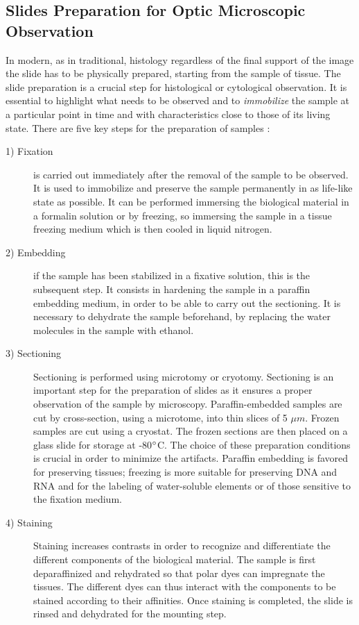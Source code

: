 \subsection{Slides Preparation for Optic Microscopic Observation} \label{ssec:samp_prep}
    In modern, as in traditional, histology regardless of the final support of the image the slide has to be physically prepared, starting from the sample of tissue. The slide preparation is a crucial step for histological or cytological observation. It is essential to highlight what needs to be observed and to \textit{immobilize} the sample at a particular point in time and with characteristics close to those of its living state. There are five key steps for the preparation of samples \cite{Alturkistani2015}:
    \begin{description}
        \item [1) Fixation] is carried out immediately after the removal of the sample to be observed. It is used to immobilize and preserve the sample permanently in as life-like state as possible. It can be performed immersing the biological material in a formalin solution or by freezing, so immersing the sample in a tissue freezing medium which is then cooled in liquid nitrogen.

        \item [2) Embedding] if the sample has been stabilized in a fixative solution, this is the subsequent step. It consists in hardening the sample in a paraffin embedding medium, in order to be able to carry out the sectioning. It is necessary to dehydrate the sample beforehand, by replacing the water molecules in the sample with ethanol.

        \item [3) Sectioning] Sectioning is performed using microtomy or cryotomy. Sectioning is an important step for the preparation of slides as it ensures a proper observation of the sample by microscopy. Paraffin-embedded samples are cut by cross-section, using a microtome, into thin slices of 5 $\mu m$. Frozen samples are cut using a cryostat. The frozen sections are then placed on a glass slide for storage at -80$\degree$C. The choice of these preparation conditions is crucial in order to minimize the artifacts. Paraffin embedding is favored for preserving tissues; freezing is more suitable for preserving DNA and RNA and for the labeling of water-soluble elements or of those sensitive to the fixation medium.

        \item [4) Staining] Staining increases contrasts in order to recognize and differentiate the different components of the biological material. The sample is first deparaffinized and rehydrated so that polar dyes can impregnate the tissues. The different dyes can thus interact with the components to be stained according to their affinities. Once staining is completed, the slide is rinsed and dehydrated for the mounting step.

    \end{description}

